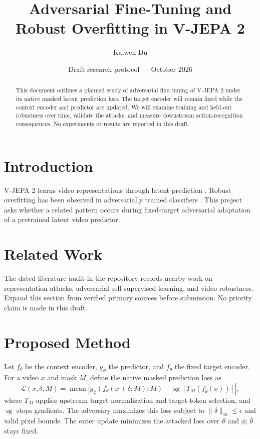 \documentclass[11pt]{article}
\title{Adversarial Fine-Tuning and Robust Overfitting in V-JEPA 2}
\author{Kaiwen Du}
\date{Draft research protocol --- October 2026}
\begin{document}
\maketitle

\begin{abstract}
This document outlines a planned study of adversarial fine-tuning of
V-JEPA 2 under its native masked latent prediction loss. The target encoder
will remain fixed while the context encoder and predictor are updated.
We will examine training and held-out robustness over time, validate the
attacks, and measure downstream action-recognition consequences.
No experiments or results are reported in this draft.
\end{abstract}

\section{Introduction}
V-JEPA 2 learns video representations through latent prediction
\cite{assran2025vjepa2}. Robust overfitting has been observed in
adversarially trained classifiers \cite{rice2020overfitting}.
This project asks whether a related pattern occurs during fixed-target
adversarial adaptation of a pretrained latent video predictor.

\section{Related Work}
The dated literature audit in the repository records nearby work on
representation attacks, adversarial self-supervised learning, and video
robustness. Expand this section from verified primary sources before
submission. No priority claim is made in this draft.

\section{Proposed Method}
Let $f_{\theta}$ be the context encoder, $g_{\phi}$ the predictor,
and $f_{\bar{\theta}}$ the fixed target encoder. For a video $x$ and
mask $M$, define the native masked prediction loss as
\begin{equation}
  \mathcal{L}(x,\delta,M) =
  \operatorname{mean}\left|
  g_{\phi}(f_{\theta}(x+\delta;M);M)
  - \operatorname{sg}\!\left[T_M(f_{\bar{\theta}}(x))\right]
  \right|,
\end{equation}
where $T_M$ applies upstream target normalization and target-token
selection, and $\operatorname{sg}$ stops gradients. The adversary
maximizes this loss subject to $\|\delta\|_{\infty}\leq\epsilon$
and valid pixel bounds. The outer update minimizes the attacked loss
over $\theta$ and $\phi$; $\bar{\theta}$ stays fixed.
\end{document}
